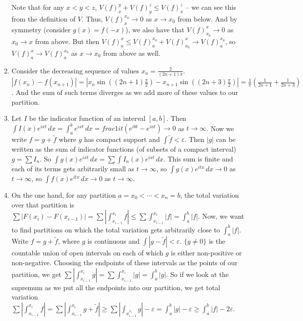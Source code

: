 \documentclass{article}
\begin{document}
\begin{enumerate}
     Note that for any $x<y<z$, $V(f)_x^y + V(f)_y^z \leq
     V(f)_x^z$ -- we can see this from the definition of $V$. Thus,
     $V(f)_x^{x_0} \to 0$ as $x\to x_0$ from below. And by symmetry (consider
     $g(x)=f(-x)$), we also have that $V(f)_{x_0}^x \to 0$ as $x_0 \to x$ from
     above. But then $V(f)_a^x \leq V(f)_a^{x_0} + V(f)_{x_0}^x \to
     V(f)_a^{x_0}$, so $V(f)_a^x \to V(f)_a^{x_0}$ as $x \to x_0$ from above as
     well.
     
  \item Consider the decreasing sequence of values $x_n = \frac2{(2n+1)\pi}$.
     $|f(x_n)-f(x_{n+1})| = |x_n\sin( (2n+1)\frac\pi2) - x_{n+1}\sin( (2n+3)
     \frac\pi2)| = \frac1\pi(\frac1{2n+1} + \frac1{2n+3})$. And the sum of such
     terms diverges as we add more of these values to our partition.

  \item Let $I$ be the indicator function of an interval $[a,b]$. Then $\int
     I(x)e^{ixt}\,dx = \int_a^b e^{ixt}\,dx = frac1{it}(e^{ibt} - e^{iat}) \to
     0$ as $t \to \infty$. Now we write $f = g + \tilde f$ where $g$ has compact
     support and $\int \tilde f < \varepsilon$. Then $|g|$ can be written as the
     sum of indicator functions (of subsets of a compact interval) $g = \sum
     I_n$. So $\int g(x)e^{ixt}\,dx = \sum \int I_n(x)e^{ixt}\,dx$. This sum is
     finite and each of its terms gets arbitrarily small as $t \to \infty$, so
     $\int g(x)e^{itx}\,dx \to 0$ as $t \to \infty$, so $\int f(x)e^{itx}\,dx
     \to 0$ as $t \to \infty$.

  \item On the one hand, for any partition $a=x_0<\dotsb<x_n=b$, the total
     variation over that partition is $\sum |F(x_i)-F(x_{i-1})| = \sum
     |\int_{x_{i-1}}^{x_i} f| \leq \sum \int_{x_{i-1}}^{x_i} |f| = \int_a^b
     |f|$. Now, we want to find partitions on which the total variation gets
     arbitrarily close to $\int_a^b |f|$. Write $f = g + \tilde f$, where
     $g$ is continuous and $\int |g-\tilde f| < \varepsilon$. $\{g \neq 0\}$ is
     the countable union of open intervals on each of which $g$ is either
     non-positive or non-negative.  Choosing the endpoints of these intervals as
     the points of our partition, we get  $\sum |\int_{x_{i-1}}^{x_i} g| = \sum
     \int_{x_{i-1}}^{x_i} |g| = \int_a^b |g|$. So if we look at the supremum as
     we put all the endpoints into our partition, we get total variation $\sum
     |\int_{x_{i-1}}^{x_i} f| = \sum |\int_{x_{i-1}}^{x_i} g+\tilde f| \geq \sum
     |\int_{x_{i-1}^{x_i}} g| - \varepsilon = \int_a^b |g| - \varepsilon \geq
     \int_a^b |f| - 2\varepsilon$.


\end{enumerate}
\end{document}
